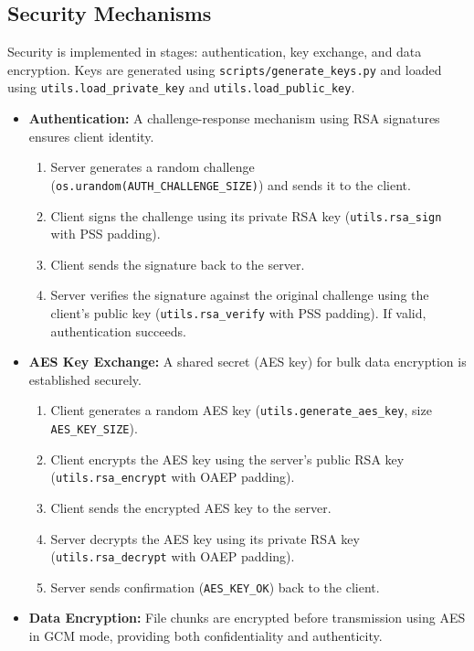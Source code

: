 \documentclass[11pt]{article}
\begin{document}
\subsection{Security Mechanisms}
\label{sec:security}
Security is implemented in stages: authentication, key exchange, and data encryption. Keys are generated using \texttt{scripts/generate\_keys.py} and loaded using \texttt{utils.load\_private\_key} and \texttt{utils.load\_public\_key}.
\begin{itemize}
    \item \textbf{Authentication:} A challenge-response mechanism using RSA signatures ensures client identity.
        \begin{enumerate}
            \item Server generates a random challenge (\texttt{os.urandom(AUTH\_CHALLENGE\_SIZE)}) and sends it to the client.
            \item Client signs the challenge using its private RSA key (\texttt{utils.rsa\_sign} with PSS padding).
            \item Client sends the signature back to the server.
            \item Server verifies the signature against the original challenge using the client's public key (\texttt{utils.rsa\_verify} with PSS padding). If valid, authentication succeeds.
        \end{enumerate}
    \item \textbf{AES Key Exchange:} A shared secret (AES key) for bulk data encryption is established securely.
        \begin{enumerate}
            \item Client generates a random AES key (\texttt{utils.generate\_aes\_key}, size \texttt{AES\_KEY\_SIZE}).
            \item Client encrypts the AES key using the server's public RSA key (\texttt{utils.rsa\_encrypt} with OAEP padding).
            \item Client sends the encrypted AES key to the server.
            \item Server decrypts the AES key using its private RSA key (\texttt{utils.rsa\_decrypt} with OAEP padding).
            \item Server sends confirmation (\texttt{AES\_KEY\_OK}) back to the client.
        \end{enumerate}
    \item \textbf{Data Encryption:} File chunks are encrypted before transmission using AES in GCM mode, providing both confidentiality and authenticity.

\end{itemize}
\end{document}
